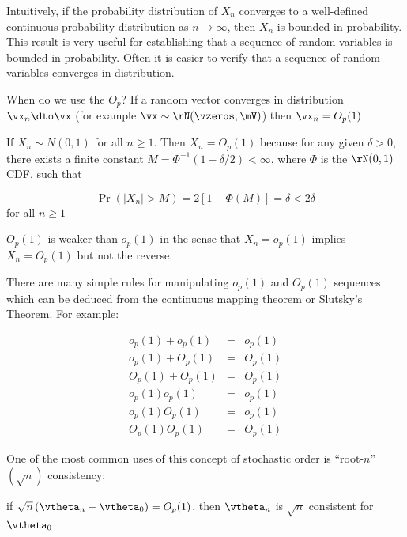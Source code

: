 \documentclass[english,12pt]{book}\usepackage[]{graphicx}\usepackage[]{xcolor}
\begin{document}
Intuitively, if the probability distribution of $X_n$ converges to a well-defined continuous probability distribution as $n\to \infty$, then $X_n$ is bounded in probability. This result is very useful for establishing that a sequence of random variables is bounded in probability. Often it is easier to verify that a sequence of random variables converges in distribution. 

When do we use the $O_p$?  If a random vector converges in distribution $\vx_n \dto \vx$ (for example $\vx\sim \rN(\vzeros, \mV)$) then $\vx_n = O_p(1)$. 

\begin{example}
  If $X_n\sim N(0,1)$ for all $n\geq 1$. Then $X_n = O_p(1)$ because for any given $\delta > 0$, there exists a finite constant $M = \Phi^{-1}(1 - \delta/2)<\infty$, where $\Phi$ is the $\rN(0, 1)$ CDF, such that
  
  \begin{equation*}
    \Pr(\left|X_n\right| > M) = 2\left[1 - \Phi(M)\right] = \delta < 2\delta
  \end{equation*}
  for all $n \geq 1$
\end{example}

$O_p(1)$ is weaker than $o_p(1)$ in the sense that $X_n = o_p(1)$ implies $X_n = O_p(1)$ but not the reverse.

There are many simple rules for manipulating $o_p(1)$ and $O_p(1)$ sequences which can be deduced from the continuous mapping theorem or Slutsky's Theorem. For example:

\begin{eqnarray*}
 o_p(1) + o_p(1) & = & o_p(1) \\
 o_p(1) + O_p(1) & = & O_p(1) \\
 O_p(1) + O_p(1) & = & O_p(1) \\
 o_p(1) o_p(1)   & = & o_p(1) \\
 o_p(1) O_p(1)   & = & o_p(1) \\
 O_p(1) O_p(1)   & = & O_p(1)
\end{eqnarray*}

One of the most common uses of this concept of stochastic order is ``root-$n$'' $(\sqrt{n})$ consistency:

\begin{definition}
		if $\sqrt{n}\left(\vtheta_n - \vtheta_0\right)= O_p(1)$, then $\vtheta_n$ is $\sqrt{n}$ consistent for $\vtheta_0$
\end{definition}
\end{document}

